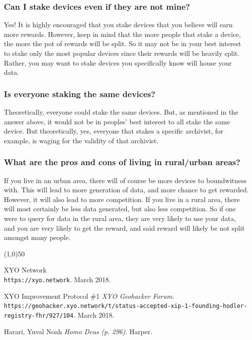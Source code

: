 \documentclass{article}
\begin{document}
\subsubsection{Can I stake devices even if they are not mine?}
Yes! It is highly encouraged that you stake devices that you believe will earn more rewards. However, keep in mind that the more people that stake a device, the more the pot of rewards will be split. So it may not be in your best interest to stake only the most popular devices since their rewards will be heavily split. Rather, you may want to stake devices you specifically know will house your data.

\subsubsection{Is everyone staking the same devices?}
Theoretically, everyone could stake the same devices. But, as mentioned in the answer above, it would not be in peoples' best interest to all stake the same device. But theoretically, yes, everyone that stakes a specific archivist, for example, is waging for the validity of that archivist.

\subsubsection{What are the pros and cons of living in rural/urban areas?}
If you live in an urban area, there will of course be more devices to boundwitness with. This will lead to more generation of data, and more chance to get rewarded. However, it will also lead to more competition. If you live in a rural area, there will most certainly be less data generated, but also less competition. So if one were to query for data in the rural area, they are very likely to use your data, and you are very likely to get the reward, and said reward will likely be not split amongst many people.
\begin{center}
\line(1,0){50}
\end{center}

\begin{thebibliography}{9}

XYO Network
\\\texttt{https://xyo.network}.
March 2018.

XYO Improvement Protocol \#1
\textit{XYO Geohacker Forum}.
\\\texttt{https://geohacker.xyo.network/t/status-accepted-xip-1-founding-hodler-registry-fhr/927/104}.
March 2018.

Harari, Yuval Noah
\textit{Homo Deus (p. 296)}. 
Harper.


\end{thebibliography}

\end{document}
